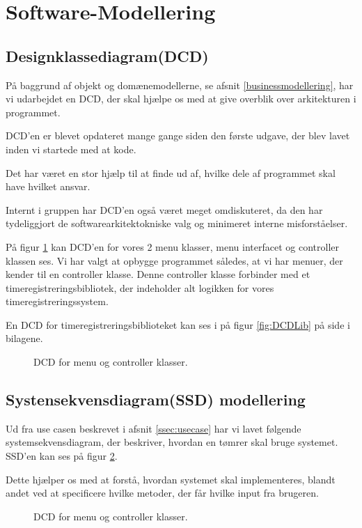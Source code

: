 \section{Software-Modellering}\label{softwaremodellering}

\subsection{Designklassediagram(DCD)}

På baggrund af objekt og domænemodellerne, se afsnit \ref{businessmodellering}, har vi udarbejdet en DCD, der skal hjælpe os med at give overblik over arkitekturen i programmet.

DCD'en er blevet opdateret mange gange siden den første udgave, der blev lavet inden vi startede med at kode.

Det har været en stor hjælp til at finde ud af, hvilke dele af programmet skal have hvilket ansvar.

Internt i gruppen har DCD'en også været meget omdiskuteret, da den har tydeliggjort de softwarearkitektokniske valg og minimeret interne misforståelser.


På figur \ref{fig:DCDMenu} kan DCD'en for vores 2 menu klasser, menu interfacet og controller klassen ses.
Vi har valgt at opbygge programmet således, at vi har menuer, der kender til en controller klasse.
Denne controller klasse forbinder med et timeregistreringsbibliotek, der indeholder alt logikken for vores timeregistreringssystem.

En DCD for timeregistreringsbiblioteket kan ses i på figur \ref{fig:DCDLib} på side \pageref{fig:DCDLib} i bilagene.

\begin{figure}[H]
    \caption{DCD for menu og controller klasser.}
    \label{fig:DCDMenu}
\end{figure}

\subsection{Systensekvensdiagram(SSD) modellering}

Ud fra use casen beskrevet i afsnit \ref{ssec:usecase} har vi lavet følgende systemsekvensdiagram, der beskriver, hvordan en tømrer skal bruge systemet. SSD'en kan ses på figur \ref{fig:SSDMain}.

Dette hjælper os med at forstå, hvordan systemet skal implementeres, blandt andet ved at specificere hvilke metoder, der får hvilke input fra brugeren.
\begin{figure}[H]
    \caption{DCD for menu og controller klasser.}
    \label{fig:SSDMain}
\end{figure}

